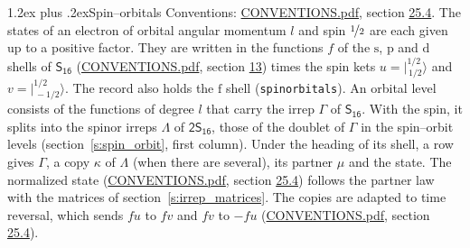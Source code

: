 \documentclass[10pt,a4paper]{article}
\makeatletter
\renewcommand\section{\@startsection{section}{1}{\z@}{-3ex plus -1ex minus -.2ex}%
  {1.2ex plus .2ex}{\normalfont\large\sffamily\bfseries\color{parttitle}}}
\numberwithin{equation}{section}
\newcommand{\grp}[1]{\mathsf{#1}}
\newcommand{\orbital}[1]{\mathrm{#1}}
\newcommand{\mult}{\kappa}
\newcommand{\intx}{\mu}
\newcommand{\jm}[2]{\bigl\lvert{}^{#1}_{\,#2}\bigr\rangle}
\makeatother
\begin{document}
\section{Spin--orbitals}\label{s:spin_orbitals}
Conventions: \href{../../CONVENTIONS.pdf}{CONVENTIONS.pdf}, section \href{../../CONVENTIONS.pdf\#conv.25.4}{25.4}.
\leavevmode\label{n:index.orbital.l}The states of an electron of orbital angular momentum $l$ and spin $\nicefrac{1}{2}$ are each given up to a positive factor. \label{n:local.spinor.uv}\label{n:local.function.f}They are written in the functions $f$ of the $\orbital{s}$, $\orbital{p}$ and $\orbital{d}$ shells of \href{../../../rotation/data/pdf/S16.pdf}{$\grp{S_{16}}$} (\href{../../CONVENTIONS.pdf}{CONVENTIONS.pdf}, section \href{../../../rotation/CONVENTIONS.pdf\#conv.13}{13}) times the spin kets $u = \jm{1/2}{1/2}$ and $v = \jm{1/2}{-1/2}$. The record also holds the $\orbital{f}$ shell (\texttt{spinorbitals}). An orbital level consists of the functions of degree $l$ that carry the irrep $\Gamma$ of \href{../../../rotation/data/pdf/S16.pdf}{$\grp{S_{16}}$}. With the spin, it splits into the spinor irreps $\Lambda$ of $\grp{2S_{16}}$, those of the doublet of $\Gamma$ in the spin--orbit levels (section~\ref{s:spin_orbit}, first column). \label{n:head.state}Under the heading of its shell, a row gives $\Gamma$, a copy $\mult$ of $\Lambda$ (when there are several), its partner $\intx$ and the state. The normalized state (\href{../../CONVENTIONS.pdf}{CONVENTIONS.pdf}, section \href{../../CONVENTIONS.pdf\#conv.25.4}{25.4}) follows the partner law with the matrices of section~\ref{s:irrep_matrices}. The copies are adapted to time reversal, which sends $f u$ to $f v$ and $f v$ to $-f u$ (\href{../../CONVENTIONS.pdf}{CONVENTIONS.pdf}, section \href{../../CONVENTIONS.pdf\#conv.25.4}{25.4}).
\end{document}
